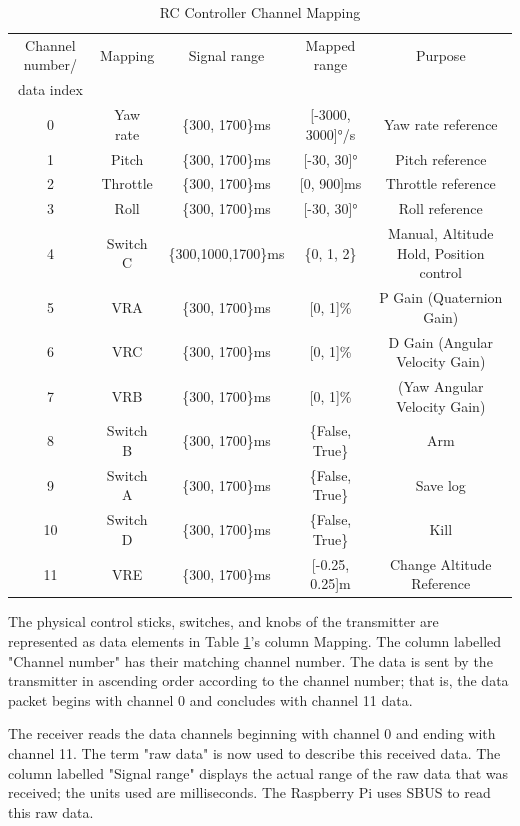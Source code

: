 \documentclass{report}
\begin{document}
\begin{table}[h]
  \centering
  \begin{tabular}{|c|c|c|c|c|}
    \hline
    Channel number/ & Mapping & Signal range & Mapped range & Purpose \\
    data index & & & & \\
    \hline
    0 & Yaw rate & \{300, 1700\}ms & [-3000, 3000]°/s & Yaw rate reference \\
    1 & Pitch & \{300, 1700\}ms & [-30, 30]° & Pitch reference \\
    2 & Throttle & \{300, 1700\}ms & [0, 900]ms & Throttle reference \\
    3 & Roll & \{300, 1700\}ms & [-30, 30]° & Roll reference \\
    4 & Switch C & \{300,1000,1700\}ms & \{0, 1, 2\} & Manual, Altitude Hold,
    Position control \\
    5 & VRA & \{300, 1700\}ms & [0, 1]\% & P Gain (Quaternion Gain) \\
    6 & VRC & \{300, 1700\}ms & [0, 1]\% & D Gain (Angular Velocity Gain) \\
    7 & VRB & \{300, 1700\}ms & [0, 1]\% & (Yaw Angular Velocity Gain)\\
    8 & Switch B & \{300, 1700\}ms & \{False, True\} & Arm \\
    9 & Switch A & \{300, 1700\}ms & \{False, True\} & Save log \\
    10 & Switch D & \{300, 1700\}ms & \{False, True\} & Kill \\
    11 & VRE & \{300, 1700\}ms & [-0.25, 0.25]m & Change Altitude Reference\\
    \hline
  \end{tabular}
  \caption{RC Controller Channel Mapping}
  \label{Figure RC_Controller_Channel_Mapping}
\end{table}

The physical control sticks, switches, and knobs of the transmitter are
represented as data elements in Table
\ref{Figure RC_Controller_Channel_Mapping}'s column Mapping. The column labelled
"Channel number" has their matching channel number. The data is sent by the
transmitter in ascending order according to the channel number; that is, the
data packet begins with channel 0 and concludes with channel 11 data.

The receiver reads the data channels beginning with channel 0 and ending with
channel 11. The term "raw data" is now used to describe this received data. The
column labelled "Signal range" displays the actual range of the raw data that
was received; the units used are milliseconds. The Raspberry Pi uses SBUS to
read this raw data.
\end{document}
